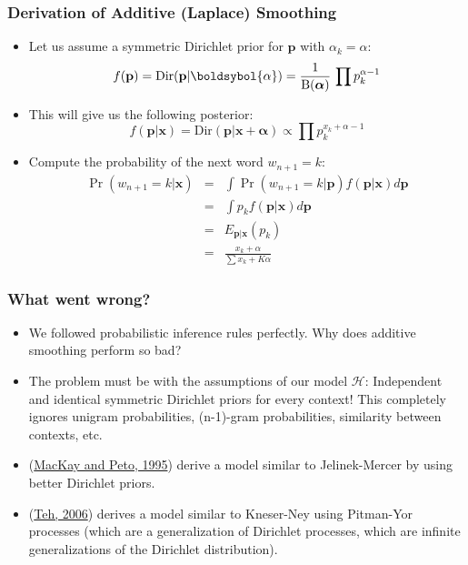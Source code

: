 \documentclass[ignorenonframetext]{beamer}
\begin{document}
\begin{frame}\frametitle{Derivation of Additive (Laplace) Smoothing}
\begin{itemize}
\item Let us assume a symmetric Dirichlet prior for $\mathbf{p}$ with
  $\alpha_k = \alpha$:\[
f(\mathbf{p}) = \mbox{Dir}(\mathbf{p}|\boldsybol{\alpha}) = \frac{1}{\mbox{B}(\boldsymbol{\alpha})}\,
\prod p_k^{\alpha-1}
\]

\item This will give us the following posterior: \[
f(\mathbf{p}|\mathbf{x}) = \mbox{Dir}(\mathbf{p}|\mathbf{x}+\boldsymbol{\alpha})
\propto \prod p_k^{x_k + \alpha - 1}
\]

\item Compute the probability of the next word
  $w_{n+1}=k$:\begin{eqnarray*}
\Pr(w_{n+1}=k|\mathbf{x}) &=& \int \Pr(w_{n+1}=k|\mathbf{p})
f(\mathbf{p}|\mathbf{x}) d\mathbf{p} \\
&=& \int p_k f(\mathbf{p}|\mathbf{x}) d\mathbf{p} \\
&=& E_{\mathbf{p}|\mathbf{x}}(p_k)\\
&=& \frac{x_k + \alpha}{\sum x_k + K\alpha}
\end{eqnarray*}

\end{itemize}
\end{frame}

\begin{frame}\frametitle{What went wrong?}
\begin{itemize}
\item We followed probabilistic inference rules perfectly.  Why does
  additive smoothing perform so bad?
\item The problem must be with the assumptions of our model
  $\mathcal{H}$: Independent and identical symmetric Dirichlet priors
  for every context!  This completely ignores unigram probabilities,
  (n-1)-gram probabilities, similarity between contexts, etc.
\item (\href{http://www2.denizyuret.com/ref/mackay/lang4.pdf}{MacKay
  and Peto, 1995}) derive a model similar to Jelinek-Mercer by using
  better Dirichlet priors.
\item (\href{http://aclweb.org/anthology/P/P06/P06-1124.pdf}{Teh,
  2006}) derives a model similar to Kneser-Ney using Pitman-Yor
  processes (which are a generalization of Dirichlet processes, which
  are infinite generalizations of the Dirichlet distribution).
\end{itemize}
\end{frame}
\end{document}
